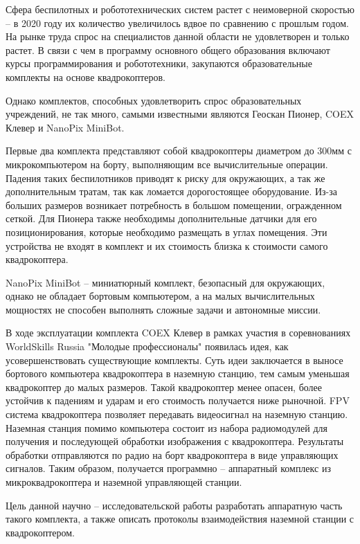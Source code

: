 Сфера беспилотных и робототехнических систем растет с неимоверной скоростью -- в 2020 году их количество увеличилось вдвое по сравнению с прошлым годом. На рынке труда спрос на специалистов данной области не удовлетворен и только растет. В связи с чем в программу основного общего образования включают курсы программирования и робототехники, закупаются образовательные комплекты на основе квадрокоптеров. \cite{minobr}

Однако комплектов, способных удовлетворить спрос образовательных учреждений, не так много, самыми известными являются Геоскан Пионер, COEX Клевер и NanoPix MiniBot.

Первые два комплекта представляют собой квадрокоптеры диаметром до 300мм с микрокомпьютером на борту, выполняющим все вычислительные операции. Падения таких беспилотников приводят к риску для окружающих, а так же дополнительным тратам, так как ломается дорогостоящее оборудование. Из-за больших размеров возникает потребность в большом помещении, огражденном сеткой. Для Пионера также необходимы дополнительные датчики для его позиционирования, которые необходимо размещать в углах помещения. Эти устройства не входят в комплект и их стоимость близка к стоимости самого квадрокоптера.

NanoPix MiniBot -- миниатюрный комплект, безопасный для окружающих, однако не обладает бортовым компьютером, а на малых вычислительных мощностях не способен выполнять сложные задачи и автономные миссии.

В ходе эксплуатации комплекта COEX Клевер в рамках участия в соревнованиях WorldSkills Russia "Молодые профессионалы" появилась идея, как усовершенствовать существующие комплекты.
Суть идеи заключается в выносе бортового компьютера квадрокоптера в наземную станцию, тем самым уменьшая квадрокоптер до малых размеров. Такой квадрокоптер менее опасен, более устойчив к падениям и ударам и его стоимость получается ниже рыночной. FPV система квадрокоптера позволяет передавать видеосигнал на наземную станцию. Наземная станция помимо компьютера состоит из набора радиомодулей для получения и последующей обработки изображения с квадрокоптера. Результаты обработки отправляются по радио на борт квадрокоптера в виде управляющих сигналов. Таким образом, получается программно -- аппаратный комплекс из микроквадрокоптера и наземной управляющей станции.

Цель данной научно -- исследовательской работы разработать аппаратную часть такого комплекта, а также описать протоколы взаимодействия наземной станции с квадрокоптером.
